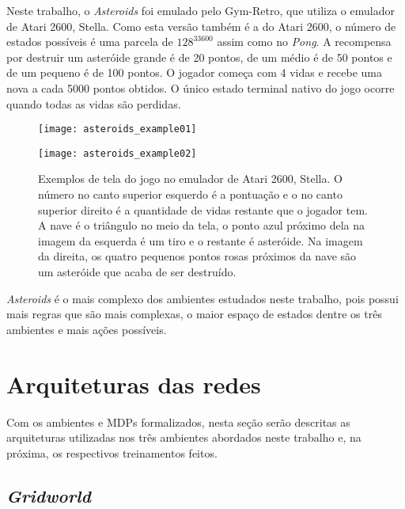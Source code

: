 Neste trabalho, o \textit{Asteroids} foi emulado pelo Gym-Retro, que utiliza o emulador de Atari 2600, Stella.
Como esta versão também é a do Atari 2600, o número de estados possíveis é uma parcela de $128^{33600}$ assim como no \textit{Pong}.
A recompensa por destruir um asteróide grande é de 20 pontos, de um médio é de 50 pontos e de um pequeno é de 100 pontos.
O jogador começa com 4 vidas e recebe uma nova a cada 5000 pontos obtidos.
O único estado terminal nativo do jogo ocorre quando todas as vidas são perdidas.

\begin{figure}[h!]
  \begin{minipage}[b]{.5\textwidth}
  \centering
  \texttt{[image: asteroids\_example01]}
  \end{minipage}
  \hfill
  \begin{minipage}[b]{.5\textwidth}
  \texttt{[image: asteroids\_example02]}
  \end{minipage}
  \caption{Exemplos de tela do jogo no emulador de Atari 2600, Stella. O número no canto superior esquerdo é a pontuação e o no canto superior direito é a quantidade de vidas restante que o jogador tem. A nave é o triângulo no meio da tela, o ponto azul próximo dela na imagem da esquerda é um tiro e o restante é asteróide. Na imagem da direita, os quatro pequenos pontos rosas próximos da nave são um asteróide que acaba de ser destruído.}
\end{figure}

\textit{Asteroids} é o mais complexo dos ambientes estudados neste trabalho, pois possui mais regras que são mais complexas, o maior espaço de estados dentre os três ambientes e mais ações possíveis. 


\section{Arquiteturas das redes}
\label{sec:arq}

Com os ambientes e MDPs formalizados, nesta seção serão descritas as arquiteturas utilizadas nos três ambientes abordados neste trabalho e, na próxima, os respectivos treinamentos feitos.

\subsection{\textit{Gridworld}}
\label{sec:arq_gw}


